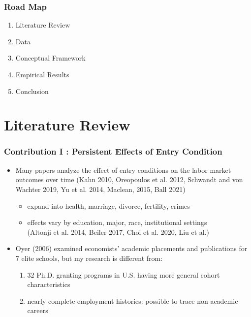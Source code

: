 \documentclass[10pt,svgnames,fragile]{beamer}
\begin{document}
\begin{frame}
	\frametitle{Road Map}
	\begin{enumerate}
		\item Literature Review
\vfill
		\item Data
\vfill
		\item Conceptual Framework 
\vfill
		\item Empirical Results
\vfill
		\item Conclusion
\vfill
	\end{enumerate}
\end{frame}



{
\AtBeginSection{}
\section{Literature Review}
\begin{frame}
	\frametitle{Contribution I : Persistent Effects of Entry Condition} 
	\begin{itemize}
		\item Many papers analyze the effect of entry conditions on the labor market outcomes over time (Kahn 2010, Oreopoulos et al. 2012, Schwandt and von Wachter 2019, Yu et al. 2014,  Maclean, 2015, Ball 2021)
		\begin{itemize}
\vfill
			\item expand into health, marriage, divorce, fertility, crimes
			\vspace{2 mm}
			\item effects vary by education, major, race, institutional settings \\(Altonji et al. 2014, Beiler 2017, Choi et al. 2020, Liu et al.)
		\end{itemize}
\vfill
		\item Oyer (2006) examined economists' academic placements and publications for 7 elite schools, but my research is different from:
		\vfill
		\begin{enumerate}
			\item 32 Ph.D. granting programs in U.S. having more general cohort characteristics
			\vspace{2 mm}
			\item nearly complete employment histories: possible to trace non-academic careers
		\vspace{2 mm}

\end{enumerate}
\end{itemize}
\end{frame}}
\end{document}
